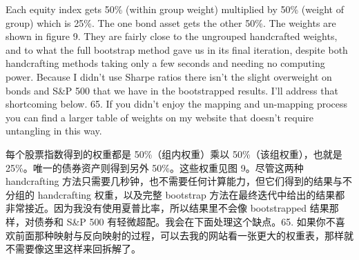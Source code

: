 \medskip

\begin{englishblock} Each equity index gets 50\% (within group weight) multiplied by 50\% (weight of group) which is 25\%. The one bond asset gets the other 50\%. The weights are shown in figure 9. They are fairly close to the ungrouped handcrafted weights, and to what the full bootstrap method gave us in its final iteration, despite both handcrafting methods taking only a few seconds and needing no computing power. Because I didn’t use Sharpe ratios there isn’t the slight overweight on bonds and S\&P 500 that we have in the bootstrapped results. I’ll address that shortcoming below. 65. If you didn’t enjoy the mapping and un-mapping process you can find a larger table of weights on my website that doesn’t require untangling in this way. \end{englishblock}

\begin{chineseblock}每个股票指数得到的权重都是 50\%（组内权重）乘以 50\%（该组权重），也就是 25\%。唯一的债券资产则得到另外 50\%。这些权重见图 9。尽管这两种 handcrafting 方法只需要几秒钟，也不需要任何计算能力，但它们得到的结果与不分组的 handcrafting 权重，以及完整 bootstrap 方法在最终迭代中给出的结果都非常接近。因为我没有使用夏普比率，所以结果里不会像 bootstrapped 结果那样，对债券和 S\&P 500 有轻微超配。我会在下面处理这个缺点。65. 如果你不喜欢前面那种映射与反向映射的过程，可以去我的网站看一张更大的权重表，那样就不需要像这里这样来回拆解了。\end{chineseblock}

\begin{chinesetableblock} \begingroup \small \centering
{}
\par \endgroup \end{chinesetableblock}

